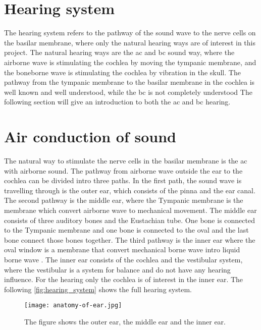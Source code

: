 \section{Hearing system}
The hearing system refers to the pathway of the sound wave to the nerve cells on the basilar membrane, where only the natural hearing ways are of interest in this project. The natural hearing ways are the \gls{ac} and \gls{bc} sound way, where the airborne wave is stimulating the cochlea by moving the tympanic membrane, and the boneborne wave is stimulating the cochlea by vibration in the skull. The pathway from the tympanic membrane to the basilar membrane in the cochlea is well known and well understood, while the \gls{bc} is not completely understood \citep{stenfelt_2005} The following section will give an introduction to both the \gls{ac} and \gls{bc} hearing.


\section{Air conduction of sound}
The natural way to stimulate the nerve cells in the basilar membrane is the \gls{ac} with airborne sound. The pathway from airborne wave outside the ear to the cochlea can be divided intro three paths. In the first path, the sound wave is travelling through is the outer ear, which consists of the pinna and the ear canal. The second pathway is the middle ear, where the Tympanic membrane is the membrane which convert airborne wave to mechanical movement. The middle ear consists of three auditory bones and the Eustachian tube. One bone is connected to the Tympanic membrane and one bone is connected to the oval and the last bone connect those bones together. The third pathway is the inner ear where the oval window is a membrane that convert mechanical borne wave intro liquid borne wave \citep{ho_2017}. The inner ear consists of the cochlea and the vestibular system, where the vestibular is a system for balance and do not have any hearing influence. For the hearing only the cochlea is of interest in the inner ear. The following \autoref{fig:hearing_system} shows the full hearing system.


 \begin{figure}[H]
	\centering
		\texttt{[image: anatomy-of-ear.jpg]}
		\caption{The figure shows the outer ear, the middle ear and the inner ear.}
		\label{fig:hearing_system}
\end{figure}

